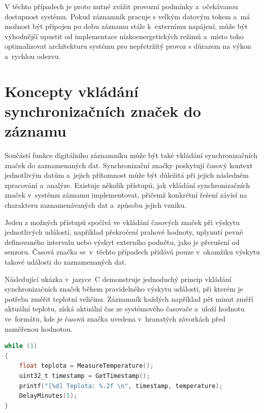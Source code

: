 V těchto případech je proto nutné zvážit provozní podmínky a~očekávanou dostupnost systému. Pokud záznamník pracuje s velkým datovým tokem a~má možnost být připojen po dobu záznamu stále k~externímu napájení, může být výhodnější upustit od implementace nízkoenergetických režimů a~místo toho optimalizovat architekturu systému pro nepřetržitý provoz s důrazem na výkon a~rychlou odezvu.~\cite{analog_devices_low_power_modes}


\section{Koncepty vkládání synchronizačních značek do záznamu} 
\label{casove_znacky}
Součástí funkce digitálního záznamníku může být také vkládání synchronizačních značek do zaznamenaných dat. Synchronizační značky poskytují časový kontext jednotlivým datům a~jejich přítomnost může být důležitá při jejich následném zpracování a~analýze. Existuje několik přístupů, jak vkládání synchronizačních značek v~systému záznamu implementovat, přičemž konkrétní řešení závisí na charakteru zaznamenávaných dat a~způsobu jejich vzniku.~\cite{researchgate_general_dataloggger_multiple_sdcards, perny2008zarizeni_cas_znacky}

Jeden z možných přístupů spočívá ve vkládání časových značek při výskytu jednotlivých událostí, například překročení prahové hodnoty, uplynutí pevně definovaného intervalu nebo výskyt externího podnětu, jako je přerušení od senzoru. Časová značka se~v~těchto případech přidává pouze v~okamžiku výskytu takové události do zaznamenaných dat.~\cite{datalogger_implementation_temperature, researchgate_general_dataloggger_multiple_sdcards, ieee_multi_connectivity_datalogger_sd_card}

Následující ukázka v~jazyce~C demonstruje jednoduchý princip vkládání synchronizačních značek během pravidelného výskytu události, při kterém je potřeba změřit teplotní veličinu. Záznamník každých například pět minut změří aktuální teplotu, získá aktuální čas ze systémového časovače a~uloží hodnotu ve~formátu, kde je časová značka uvedena v~hranatých závorkách před naměřenou hodnotou.~\cite{datalogger_implementation_temperature}

\begin{lstlisting}[language=C, caption={Vkládání časové značky zaznamenané události}]
while (1)
{
    float teplota = MeasureTemperature();
    uint32_t timestamp = GetTimestamp();
    printf("[%d] Teplota: %.2f \n", timestamp, temperature);
    DelayMinutes(5);
}
\end{lstlisting}

